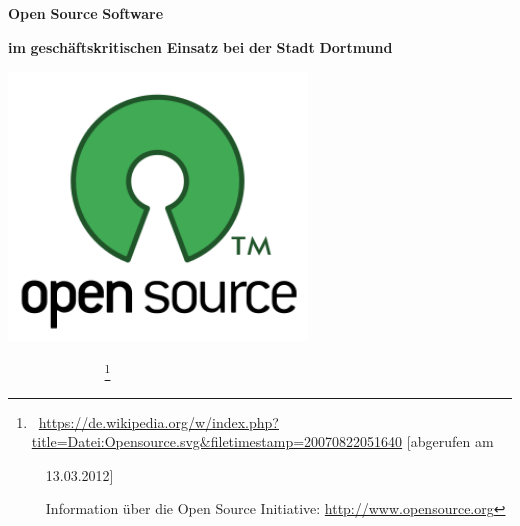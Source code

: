 \documentclass[a4paper]{article}
\title{}
\author{v32557}
\date{2012-04-30}
\newcommand\textstyleInternetlink[1]{\foreignlanguage{english}{\textcolor[rgb]{0.0,0.0,0.5019608}{#1}}}
\begin{document}
\clearpage\setcounter{page}{1}\pagestyle{Standard}
\thispagestyle{FirstPage}

\bigskip


\bigskip


\bigskip


\bigskip


\bigskip

{\centering{}
\foreignlanguage{english}{\textbf{Open}}\foreignlanguage{english}{\textbf{
}}\foreignlanguage{english}{\textbf{Source}}\foreignlanguage{english}{\textbf{
}}\foreignlanguage{english}{\textbf{Software}}
\par}

{\centering{}
\textbf{im}\textbf{ }\textbf{gesch\"aftskritischen}\textbf{
}\textbf{Einsatz}\textbf{ }\textbf{bei}\textbf{ }\textbf{der}\textbf{
}\textbf{Stadt}\textbf{ }\textbf{Dortmund}
\par}


\bigskip

{\centering \par}

\begin{center}
\includegraphics[width=3.1201in,height=2.8181in]{freiesoftwaredortmund-img1.png}
\end{center}

\bigskip


\bigskip


\bigskip

{\centering{}
\textbf{\ \ \ \ \ \ \ \ \ \ \ \ }\footnote{\ \url{https://de.wikipedia.org/w/index.php?title=Datei:Opensource.svg&filetimestamp=20070822051640}
[abgerufen am\par \ \ 13.03.2012]\par \ \ Information \"uber die Open
Source Initiative:
\href{http://www.opensource.org/}{\textstyleInternetlink{http://www.opensource.org}}}
\par}
\end{document}
